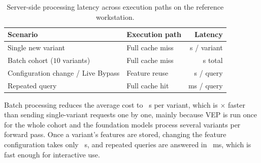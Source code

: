 \begin{table}[htbp]
    \centering
    \caption{Server-side processing latency across execution paths on the reference workstation.}
    \label{tab:latency_benchmarks}
    \begin{tabular}{llr}
        \toprule
        \textbf{Scenario} & \textbf{Execution path} & \textbf{Latency} \\
        \midrule
        Single new variant & Full cache miss & \tbd{} s / variant \\
        Batch cohort ($10$ variants) & Full cache miss & \tbd{} s total \\
        Configuration change / Live Bypass & Feature reuse & \tbd{} s / query \\
        Repeated query & Full cache hit & \tbd{} ms / query \\
        \bottomrule
    \end{tabular}
\end{table}

Batch processing reduces the average cost to \tbd{}~s per variant, which is \tbd{}$\times$ faster than sending single-variant requests one by one, mainly because VEP is run once for the whole cohort and the foundation models process several variants per forward pass. Once a variant's features are stored, changing the feature configuration takes only \tbd{}~s, and repeated queries are answered in \tbd{}~ms, which is fast enough for interactive use.
